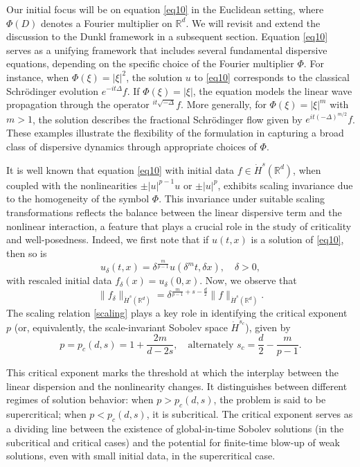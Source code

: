 \documentclass[a4paper,11pt, reqno]{amsart}
\theoremstyle{definition}
\theoremstyle{remark}
\numberwithin{equation}{section}
\begin{document}
    
Our initial focus will be on equation \eqref{eq10} in the Euclidean setting, where $\Phi(D)$ denotes a Fourier multiplier on $\mathbb{R}^d$. We will revisit and extend the discussion to the Dunkl framework in a subsequent section. 	Equation \eqref{eq10} serves as a unifying framework that includes several fundamental dispersive equations, depending on the specific choice of the Fourier multiplier $\Phi$. For instance, when $\Phi(\xi) = |\xi|^2$, the solution $u$ to \eqref{eq10} corresponds to the classical Schrödinger evolution $e^{-i t \Delta} f$. If $\Phi(\xi) = |\xi|$, the equation models the linear wave propagation through the operator $ ^{i t \sqrt{-\Delta}} f$.  More generally, for $\Phi(\xi) = |\xi|^m$ with $m > 1$, the solution describes the fractional Schrödinger flow given by $e^{i t (-\Delta)^{m/2}} f$. These examples illustrate the flexibility of the formulation in capturing a broad class of dispersive dynamics through appropriate choices of $\Phi$.

  
	
	
	It is well known that equation \eqref{eq10} with initial data $f \in \dot{H}^s(\mathbb{R}^{d})$, when coupled with the nonlinearities $\pm |u|^{p-1}u$ or $\pm |u|^p$, exhibits scaling invariance due to the homogeneity of the symbol $\Phi$. This invariance under suitable scaling transformations reflects the balance between the linear dispersive term and the nonlinear interaction, a feature that plays a crucial role in the study of criticality and well-posedness. Indeed, we first note that if $u(t,x)$ is a solution of \eqref{eq10}, then so is	
	\begin{equation*}	
		u_{\delta}(t, x)= \delta^{\frac{m}{p-1}} u(\delta^{m} t, \delta x), \quad \delta>0,
	\end{equation*}	 
	with  rescaled initial data $f_{\delta}(x)=u_{\delta}(0, x)$. Now, we observe that 
	\begin{equation}\label{scaling}
		\| f_{\delta}\|_{\dot{H}^s(\mathbb{R}^{d})} =\delta^{\frac{m}{p-1}+s-\frac{d}{2}} \|f\|_{ \dot{H}^s(\mathbb{R}^{d})}.
	\end{equation}
	The scaling relation \eqref{scaling} plays a key role in identifying the critical exponent $p$ (or, equivalently, the scale-invariant Sobolev space $\dot{H}^{s_c}$), given by
	$$
	p=p_c(d, s)=1+\frac{2m}{d-2s}, \quad \text{alternately}\,\, s_c= \frac{d}{2}-\frac{m}{p-1}.
	$$
	
    This critical exponent marks the threshold at which the interplay between the linear dispersion and the nonlinearity changes. It distinguishes between different regimes of solution behavior: when $p > p_c(d, s)$, the problem is said to be supercritical; when $p < p_c(d, s)$, it is subcritical. The critical exponent serves as a dividing line between the existence of global-in-time Sobolev solutions (in the subcritical and critical cases) and the potential for finite-time blow-up of weak solutions, even with small initial data, in the supercritical case.
	
\end{document}
